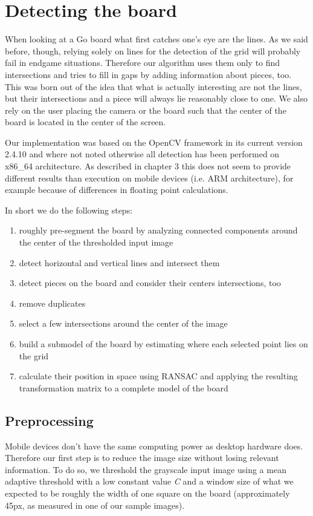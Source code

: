 
\chapter{Detecting the board}
	\label{detector}
	When looking at a Go board what first catches one's eye are the lines. As we said before, though, relying solely on lines for the detection of the grid will probably fail in endgame situations. Therefore our algorithm uses them only to find intersections and tries to fill in gaps by adding information about pieces, too. This was born out of the idea that what is actually interesting are not the lines, but their intersections and a piece will always lie reasonably close to one. We also rely on the user placing the camera or the board such that the center of the board is located in the center of the screen.

	Our implementation was based on the OpenCV framework in its current version 2.4.10 and where not noted otherwise all detection has been performed on x86\_64 architecture. As described in chapter 3 this does not seem to provide different results than execution on mobile devices (i.e. ARM architecture), for example because of differences in floating point calculations.

	In short we do the following steps:
	\begin{enumerate}
		\item roughly pre-segment the board by analyzing connected components around the center of the thresholded input image
		\item detect horizontal and vertical lines and intersect them
		\item detect pieces on the board and consider their centers intersections, too
		\item remove duplicates
		\item select a few intersections around the center of the image
		\item build a submodel of the board by estimating where each selected point lies on the grid
		\item calculate their position in space using RANSAC and applying the resulting transformation matrix to a complete model of the board
	\end{enumerate}

	\section{Preprocessing}
	\label{detector-preprocessing}
	Mobile devices don't have the same computing power as desktop hardware does. Therefore our first step is to reduce the image size without losing relevant information. To do so, we threshold the grayscale input image using a mean adaptive threshold with a low constant value \emph{C} and a window size of what we expected to be roughly the width of one square on the board (approximately 45px, as measured in one of our sample images).

